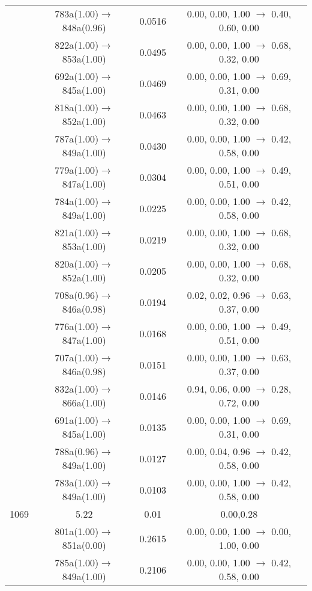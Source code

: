 \documentclass[10pt,a4paper]{article}
\begin{document}
\begin{longtable}{c|c|c|c}
 	& 783a(1.00)$\rightarrow$848a(0.96) &	 0.0516 &	 0.00, 0.00, 1.00 $\rightarrow$ 0.40, 0.60, 0.00 \\ 
 	& 822a(1.00)$\rightarrow$853a(1.00) &	 0.0495 &	 0.00, 0.00, 1.00 $\rightarrow$ 0.68, 0.32, 0.00 \\ 
 	& 692a(1.00)$\rightarrow$845a(1.00) &	 0.0469 &	 0.00, 0.00, 1.00 $\rightarrow$ 0.69, 0.31, 0.00 \\ 
 	& 818a(1.00)$\rightarrow$852a(1.00) &	 0.0463 &	 0.00, 0.00, 1.00 $\rightarrow$ 0.68, 0.32, 0.00 \\ 
 	& 787a(1.00)$\rightarrow$849a(1.00) &	 0.0430 &	 0.00, 0.00, 1.00 $\rightarrow$ 0.42, 0.58, 0.00 \\ 
 	& 779a(1.00)$\rightarrow$847a(1.00) &	 0.0304 &	 0.00, 0.00, 1.00 $\rightarrow$ 0.49, 0.51, 0.00 \\ 
 	& 784a(1.00)$\rightarrow$849a(1.00) &	 0.0225 &	 0.00, 0.00, 1.00 $\rightarrow$ 0.42, 0.58, 0.00 \\ 
 	& 821a(1.00)$\rightarrow$853a(1.00) &	 0.0219 &	 0.00, 0.00, 1.00 $\rightarrow$ 0.68, 0.32, 0.00 \\ 
 	& 820a(1.00)$\rightarrow$852a(1.00) &	 0.0205 &	 0.00, 0.00, 1.00 $\rightarrow$ 0.68, 0.32, 0.00 \\ 
 	& 708a(0.96)$\rightarrow$846a(0.98) &	 0.0194 &	 0.02, 0.02, 0.96 $\rightarrow$ 0.63, 0.37, 0.00 \\ 
 	& 776a(1.00)$\rightarrow$847a(1.00) &	 0.0168 &	 0.00, 0.00, 1.00 $\rightarrow$ 0.49, 0.51, 0.00 \\ 
 	& 707a(1.00)$\rightarrow$846a(0.98) &	 0.0151 &	 0.00, 0.00, 1.00 $\rightarrow$ 0.63, 0.37, 0.00 \\ 
 	& 832a(1.00)$\rightarrow$866a(1.00) &	 0.0146 &	 0.94, 0.06, 0.00 $\rightarrow$ 0.28, 0.72, 0.00 \\ 
 	& 691a(1.00)$\rightarrow$845a(1.00) &	 0.0135 &	 0.00, 0.00, 1.00 $\rightarrow$ 0.69, 0.31, 0.00 \\ 
 	& 788a(0.96)$\rightarrow$849a(1.00) &	 0.0127 &	 0.00, 0.04, 0.96 $\rightarrow$ 0.42, 0.58, 0.00 \\ 
 	& 783a(1.00)$\rightarrow$849a(1.00) &	 0.0103 &	 0.00, 0.00, 1.00 $\rightarrow$ 0.42, 0.58, 0.00 \\ 
 \hline1069 &	 5.22 &	 0.01 &	 0.00,0.28 \\ 
  	& 801a(1.00)$\rightarrow$851a(0.00) &	 0.2615 &	 0.00, 0.00, 1.00 $\rightarrow$ 0.00, 1.00, 0.00 \\ 
 	& 785a(1.00)$\rightarrow$849a(1.00) &	 0.2106 &	 0.00, 0.00, 1.00 $\rightarrow$ 0.42, 0.58, 0.00 \\ 

\end{longtable}
\end{document}
